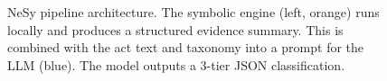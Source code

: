 \begin{figure}[t]
\caption{NeSy pipeline architecture. The symbolic engine (left, orange) runs locally and produces a structured evidence summary. This is combined with the act text and taxonomy into a prompt for the LLM (blue). The model outputs a 3-tier JSON classification.}
\label{fig:nesy-pipeline}
\end{figure}
